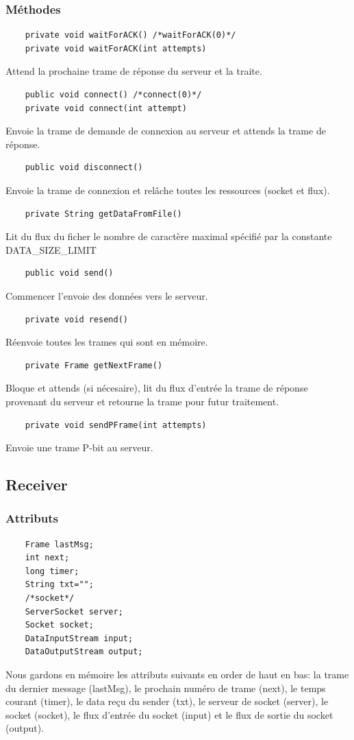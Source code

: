 \documentclass[a4paper,12pt]{article}
\begin{document}
\begin{spacing}{1}
	\subsubsection*{Méthodes}
	\begin{lstlisting}
	private void waitForACK() /*waitForACK(0)*/
	private void waitForACK(int attempts) 
	\end{lstlisting}
	Attend la prochaine trame de réponse du serveur et la traite.
	\begin{lstlisting}
	public void connect() /*connect(0)*/
	private void connect(int attempt)
	\end{lstlisting}
	Envoie la trame de demande de connexion au serveur et attends la trame de réponse.
	\begin{lstlisting}
	public void disconnect()
	\end{lstlisting}
	Envoie la trame de connexion et relâche toutes les ressources (socket et flux).
	\begin{lstlisting}
	private String getDataFromFile()
	\end{lstlisting}
	Lit du flux du ficher le nombre de caractère maximal spécifié par la constante DATA\_SIZE\_LIMIT
	\begin{lstlisting}
	public void send()
	\end{lstlisting}
	Commencer l'envoie des données vers le serveur.
	\begin{lstlisting}
	private void resend()
	\end{lstlisting}
	Réenvoie toutes les trames qui sont en mémoire.
	\begin{lstlisting}
	private Frame getNextFrame()
	\end{lstlisting}
	Bloque et attends (si nécesaire), lit du flux d'entrée la trame de réponse provenant du serveur et retourne la trame pour futur traitement.
	\begin{lstlisting}
	private void sendPFrame(int attempts)
	\end{lstlisting}
	Envoie une trame P-bit au serveur.
	\subsection*{Receiver}
	\subsubsection*{Attributs}
	\begin{lstlisting}
	Frame lastMsg;
	int next;
	long timer;
	String txt="";
	/*socket*/
	ServerSocket server;
	Socket socket;
	DataInputStream input;
	DataOutputStream output;
	\end{lstlisting}
	Nous gardons en mémoire les attributs suivants en order de haut en bas: la trame du dernier message (lastMsg), le prochain numéro de trame (next), le temps courant (timer), le data reçu du sender (txt), le serveur de socket (server), le socket (socket), le flux d'entrée du socket (input) et le flux de sortie du socket (output).

\end{spacing}
\end{document}

